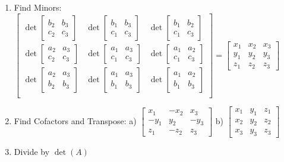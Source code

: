 \documentclass[twoside]{article}
\begin{document}
\begin{enumerate}
\item Find Minors: 
$\begin{bmatrix} 
\det\begin{bmatrix}b_2 & b_3\\ c_2 & c_3 \end{bmatrix} & \det\begin{bmatrix} b_1 & b_3 \\ c_1 & c_3\end{bmatrix} & \det\begin{bmatrix} b_1 & b_2 \\ c_1 & c_3 \end{bmatrix} \\
\det\begin{bmatrix}a_2 & a_3\\ c_2 & c_3 \end{bmatrix} & \det\begin{bmatrix} a_1 & a_3 \\ c_1 & c_3\end{bmatrix} & \det\begin{bmatrix} a_1 & a_2 \\ c_1 & c_3 \end{bmatrix} \\
\det\begin{bmatrix}a_2 & a_3\\b_2 & b_3 \end{bmatrix} & \det\begin{bmatrix} a_1 & a_3 \\ b_1 & b_3\end{bmatrix} & \det\begin{bmatrix} a_1 & a_2 \\ b_1 & b_3 \end{bmatrix} \\
\end{bmatrix} = \begin{bmatrix} x_1 & x_2 & x_3\\ y_1 & y_2 & y_3\\ z_1 & z_2 & z_3\end{bmatrix}$
\item Find Cofactors and Transpose:
a) $\begin{bmatrix} x_1 & -x_2 & x_3\\ -y_1 & y_2 & -y_3\\ z_1 & -z_2 & z_3\end{bmatrix}$ 
b) $\begin{bmatrix} x_1 & y_1 & z_1\\ x_2 & y_2 & z_2\\ x_3 & y_3 & z_3\end{bmatrix}$
\item Divide by $\det(A)$
\end{enumerate}
\end{document}
